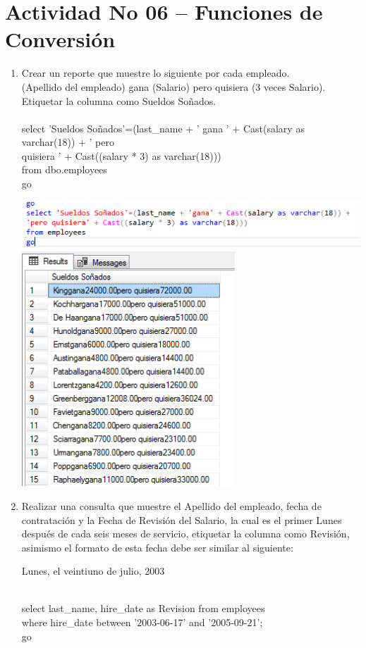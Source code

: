 \section{Actividad No 06 – Funciones de Conversi\'on} 
		
\begin{enumerate}[1.]
	\item Crear un reporte que muestre lo siguiente por cada empleado.
	\\(Apellido del empleado) gana (Salario) pero quisiera (3 veces Salario).
	\\Etiquetar la columna como Sueldos Soñados.
	\\
	\\select 'Sueldos Soñados'=(last\_name + ' gana ' + Cast(salary as varchar(18)) + ' pero 
	\\quisiera ' + Cast((salary * 3) as varchar(18))) 
	\\from dbo.employees
	\\go
	\\
	\begin{center}
	\includegraphics[width=15cm]{./Imagenes/actividad_06_01a}
	\includegraphics[width=8cm]{./Imagenes/actividad_06_01}
	\end{center}

	\item Realizar una consulta que muestre el Apellido del empleado, fecha de contratación y la Fecha de Revisión del Salario, la cual es el primer Lunes después de cada seis meses de servicio, etiquetar la columna como Revisión, asimismo el formato de esta fecha debe ser similar al siguiente: 
	\begin{center}
	Lunes, el veintiuno de julio, 2003 
	\end{center}
\
	\\select last\_name, hire\_date as Revision from employees 
	\\where hire\_date between '2003-06-17' and '2005-09-21';
	\\go
	

\end{enumerate}
